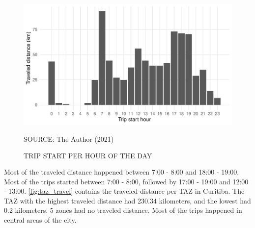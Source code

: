 \begin{figure}[!htbp]
    \centering\footnotesize
    \captionsetup{font=footnotesize}
    \caption{TRIP START PER HOUR OF THE DAY}
    \includegraphics{fig/hotd_trip.pdf}
    \label{fig:hotd_trips}
    \par SOURCE: The Author (2021)
\end{figure}

Most of the traveled distance happened between 7:00 - 8:00 and 18:00 - 19:00. Most of the trips started between 7:00 - 8:00, followed by 17:00 - 19:00 and 12:00 - 13:00. \autoref{fig:taz_travel} contains the traveled distance per TAZ in Curitiba. The TAZ with the highest traveled distance had 230.34 kilometers, and the lowest had 0.2 kilometers. 5 zones had no traveled distance. Most of the trips happened in central areas of the city.


